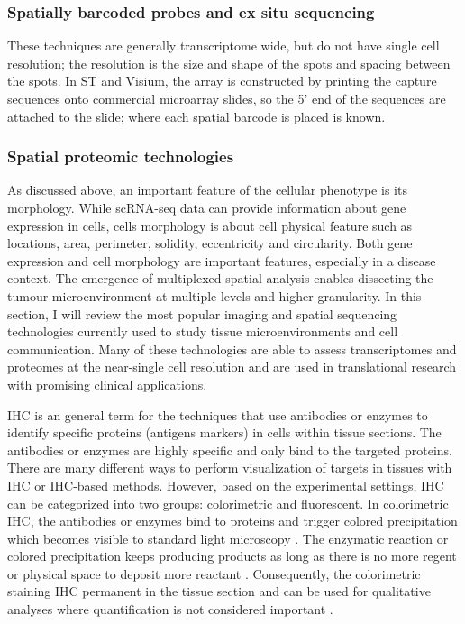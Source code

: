 \subsubsection{Spatially barcoded probes and ex situ sequencing}
These techniques are generally transcriptome wide, but do not have single cell resolution; the resolution is the size and shape of the spots and spacing between the spots. In ST and Visium, the array is constructed by printing the capture sequences onto commercial microarray slides, so the 5’ end of the sequences are attached to the slide; where each spatial barcode is placed is known. 

\subsubsection{Spatial proteomic technologies}
As discussed above, an important feature of the cellular phenotype is its morphology. While scRNA-seq data can provide information about gene expression in cells, cells morphology is about cell physical feature such as locations, area, perimeter, solidity, eccentricity and circularity. Both gene expression and cell morphology are important features, especially in a disease context. The emergence of multiplexed spatial analysis enables dissecting the tumour microenvironment at multiple levels and higher granularity. In this section, I will review the most popular imaging and spatial sequencing technologies currently used to study tissue microenvironments and cell communication. Many of these technologies are able to assess transcriptomes and proteomes at the near-single cell resolution and are used in translational research with promising clinical applications. 

IHC is an general term for the techniques that use antibodies or enzymes to identify specific proteins (antigens markers) in cells within tissue sections. The antibodies or enzymes are highly specific and only bind to the targeted proteins. There are many different ways to perform visualization of targets in tissues with IHC or IHC-based methods. However, based on the experimental settings, IHC can be categorized into two groups: colorimetric and fluorescent. In colorimetric IHC, the antibodies or enzymes bind to proteins and trigger colored precipitation which becomes visible to standard light microscopy \cite{BOURGEOIS2014132}. The enzymatic reaction or colored precipitation keeps producing products as long as there is no more regent or physical space to deposit more reactant \cite{corthell2014basic}. Consequently, the colorimetric staining IHC permanent in the tissue section and can be used for qualitative analyses where quantification is not considered important \cite{seidal2001interpretation}. 

